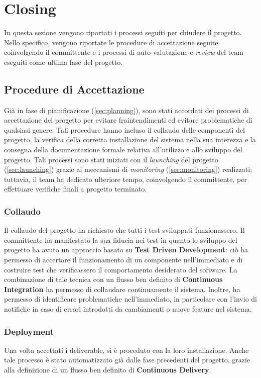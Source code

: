 \section{Closing}
\label{sec:closing}

In questa sezione vengono riportati i processi seguiti per chiudere il progetto. Nello specifico, vengono riportate le procedure di accettazione seguite coinvolgendo il committente e i processi di auto-valutazione e \textit{review} del team eseguiti come ultima fase del progetto.

\subsection{Procedure di Accettazione}
Già in fase di pianificazione (\ref{sec:planning}), sono stati accordati dei processi di accettazione del progetto per evitare fraintendimenti ed evitare problematiche di qualsiasi genere. Tali procedure hanno incluso il collaudo delle componenti del progetto, la verifica della corretta installazione del sistema nella sua interezza e la consegna della documentazione formale relativa all'utilizzo e allo sviluppo del progetto. Tali processi sono stati iniziati con il \textit{launching} del progetto (\ref{sec:launching}) grazie ai meccanismi di \textit{monitoring} (\ref{sec:monitoring}) realizzati; tuttavia, il team ha dedicato ulteriore tempo, coinvolgendo il committente, per effettuare verifiche finali a progetto terminato.

\subsubsection{Collaudo}
Il collaudo del progetto ha richiesto che tutti i test sviluppati funzionassero. Il committente ha manifestato la sua fiducia nei test in quanto lo sviluppo del progetto ha avuto un approccio basato su \textbf{Test Driven Development}: ciò ha permesso di accertare il funzionamento di un componente nell'immediato e di costruire test che verificassero il comportamento desiderato del software. La combinazione di tale tecnica con un flusso ben definito di \textbf{Continuous Integration} ha permesso di collaudare continuamente il sistema. Inoltre, ha permesso di identificare problematiche nell'immediato, in particolare con l'invio di notifiche in caso di errori introdotti da cambiamenti o nuove feature nel sistema.

\subsubsection{Deployment}
Una volta accettati i deliverable, si è proceduto con la loro installazione. Anche tale processo è stato automatizzato già dalle fase precedenti del progetto, grazie alla definizione di un flusso ben definito di \textbf{Continuous Delivery}.

